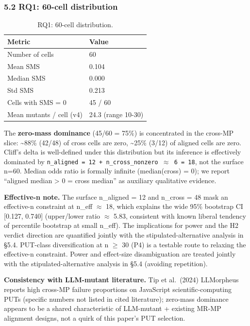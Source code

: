 \documentclass[review,12pt,authoryear]{elsarticle}
\begin{document}
\subsubsection{5.2 RQ1: 60-cell distribution}\label{rq1-60-cell-distribution}

{\def\LTcaptype{table} %
\begin{longtable}[]{@{}ll@{}}
\caption{RQ1: 60-cell distribution.}\label{tab:p2-08}\\
\toprule\noalign{}
Metric & Value \\
\midrule\noalign{}
\endhead
\bottomrule\noalign{}
\endlastfoot
Number of cells & 60 \\
Mean SMS & 0.104 \\
Median SMS & 0.000 \\
Std SMS & 0.213 \\
Cells with SMS = 0 & 45 / 60 \\
Mean mutants / cell (v4) & 24.3 (range 10-30) \\
\end{longtable}
}

The \textbf{zero-mass dominance} (45/60 = 75\%) is concentrated in the
cross-MP slice: \textasciitilde88\% (42/48) of cross cells are zero,
\textasciitilde25\% (3/12) of aligned cells are zero. Cliff's delta is
well-defined under this distribution but its inference is effectively
dominated by
\texttt{n\_aligned\ =\ 12\ +\ n\_cross\_nonzero\ $\approx$\ 6\ =\ 18}, not the
surface n=60. Median odds ratio is formally infinite (median(cross) =
0); we report ``aligned median \textgreater{} 0 = cross median'' as
auxiliary qualitative evidence.

\textbf{Effective-n note.} The surface n\_aligned = 12 and n\_cross = 48
mask an effective-n constraint at n\_eff $\approx$ 18, which explains the wide
95\% bootstrap CI {[}0.127, 0.740{]} (upper/lower ratio $\approx$ 5.83,
consistent with known liberal tendency of percentile bootstrap at small
n\_eff). The implications for power and the H2 verdict direction are
quantified jointly with the stipulated-alternative analysis in §5.4.
PUT-class diversification at n $\geq$ 30 (P4) is a testable route to relaxing
the effective-n constraint. Power and effect-size disambiguation are
treated jointly with the stipulated-alternative analysis in §5.4
(avoiding repetition).

\textbf{Consistency with LLM-mutant literature.} Tip et al.~(2024)
LLMorpheus reports high cross-MP failure proportions on JavaScript
scientific-computing PUTs (specific numbers not listed in cited
literature); zero-mass dominance appears to be a shared characteristic
of LLM-mutant + existing MR-MP alignment designs, not a quirk of this
paper's PUT selection.
\end{document}

